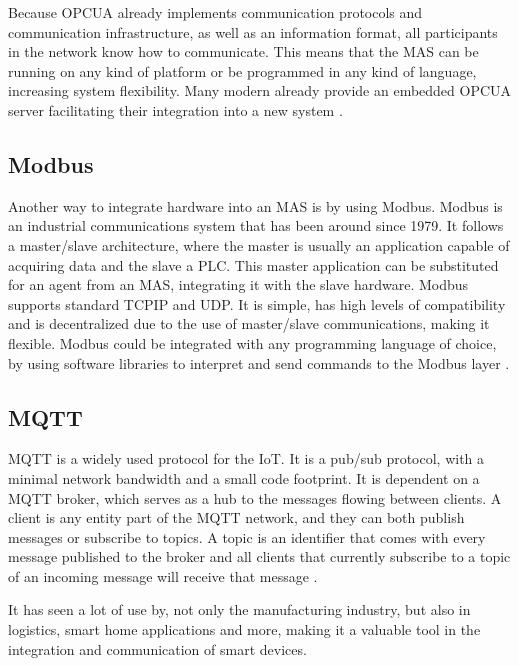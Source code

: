 Because \acrshort{OPCUA} already implements communication protocols and communication infrastructure, as well as an information format, all participants in the network know how to communicate. This means that the \acrshort{MAS} can be running on any kind of platform or be programmed in any kind of language, increasing system flexibility. Many modern  already provide an embedded \acrshort{OPCUA} server facilitating their integration into a new system \cite{Seitz2021}.

\subsection{Modbus}

Another way to integrate hardware into an \acrshort{MAS} is by using Modbus. Modbus is an industrial communications system that has been around since 1979. It follows a master/slave architecture, where the master is usually an application capable of acquiring data and the slave a \acrshort{PLC}. This master application can be substituted for an agent from an \acrshort{MAS}, integrating it with the slave hardware. Modbus supports standard \acrshort{TCPIP} and \acrshort{UDP}. It is simple, has high levels of compatibility and is decentralized due to the use of master/slave communications, making it flexible. Modbus could be integrated with any programming language of choice, by using software libraries to interpret and send commands to the Modbus layer \cite{10084891}.

\subsection{MQTT}

\acrshort{MQTT} is a widely used protocol for the \acrfull{IoT}. It is a pub/sub protocol, with a minimal network bandwidth and a small code footprint. It is dependent on a \acrshort{MQTT} broker, which serves as a hub to the messages flowing between clients. A client is any entity part of the \acrshort{MQTT} network, and they can both publish messages or subscribe to topics. A topic is an identifier that comes with every message published to the broker and all clients that currently subscribe to a topic of an incoming message will receive that message \cite{MQTT_website}.

It has seen a lot of use by, not only the manufacturing industry, but also in logistics, smart home applications and more, making it a valuable tool in the integration and communication of smart devices.

